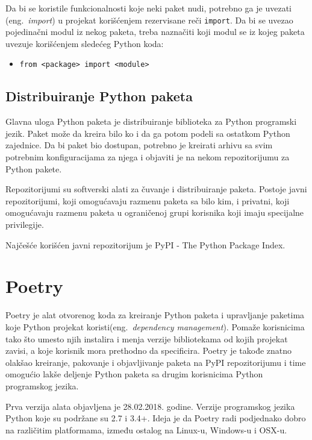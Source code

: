 \documentclass[12pt]{report}
\begin{document}
Da bi se koristile funkcionalnosti koje neki paket nudi, potrebno ga je uvezati (eng.\ \textit{import}) u projekat korišćenjem rezervisane reči \texttt{import}. Da bi se uvezao pojedinačni modul iz nekog paketa, treba naznačiti koji modul se iz kojeg paketa uvezuje korišćenjem sledećeg Python koda:

\begin{itemize}
    \item \texttt{from <package> import <module>}
\end{itemize}

\subsection{Distribuiranje Python paketa}

Glavna uloga Python paketa je distribuiranje biblioteka za Python programski jezik. Paket može da kreira bilo ko i da ga potom podeli sa ostatkom Python zajednice. Da bi paket bio dostupan, potrebno je kreirati arhivu sa svim potrebnim konfiguracijama za njega i objaviti je na nekom repozitorijumu za Python pakete.

Repozitorijumi su softverski alati za čuvanje i distribuiranje paketa. Postoje javni repozitorijumi, koji omogućavaju razmenu paketa sa bilo kim, i privatni, koji omogućavaju razmenu paketa u ograničenoj grupi korisnika koji imaju specijalne privilegije.

Najčešće korišćen javni repozitorijum je PyPI \cite{pypi}  - The Python Package Index.

\section{Poetry}
Poetry \cite{poetry} je alat otvorenog koda za kreiranje Python paketa i upravljanje paketima koje Python projekat koristi(eng.\ \textit{dependency management}). Pomaže korisnicima tako što umesto njih instalira i menja verzije  bibliotekama od kojih projekat zavisi, a koje korisnik mora prethodno da specificira. Poetry je takođe znatno olakšao kreiranje, pakovanje i objavljivanje paketa na PyPI repozitorijumu i time omogućio lakše deljenje Python paketa sa drugim korisnicima Python programskog jezika.

Prva verzija alata objavljena je 28.02.2018. godine. Verzije programskog jezika Python koje su podržane su 2.7 i 3.4+. Ideja je da Poetry radi podjednako dobro na različitim platformama, između ostalog na Linux-u, Windows-u i OSX-u.
\end{document}
